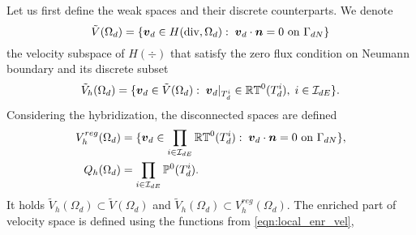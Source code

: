 Let us first define the weak spaces and their discrete counterparts.
We denote
\begin{equation}
    \tilde V(\Omega_d) = \{\mathbf{\boldsymbol{v}}_d \in H({\rm div},\Omega_d):\; \mathbf{\boldsymbol{v}}_d \cdot \mathbf{\boldsymbol{n}} = 0 \textrm{ on } \Gamma_{dN}\}
\end{equation}
the velocity subspace of $H(\div)$ that satisfy the zero flux condition on Neumann boundary
and its discrete subset
\begin{equation}
    \tilde V_h(\Omega_d) = \{\mathbf{\boldsymbol{v}}_d \in \tilde V(\Omega_d):\; \mathbf{\boldsymbol{v}}_d|_{T^i_d} \in\mathbb{RT}^0(T^i_d),\; i\in\mathcal{I}_{dE}\}.
\end{equation}
Considering the hybridization, the disconnected spaces are defined
\begin{align}
    V^{reg}_{h}(\Omega_d) &= \{\mathbf{\boldsymbol{v}}_d \in \prod_{i\in\mathcal{I}_{dE}} \mathbb{RT}^0(T^i_d):\;
        \mathbf{\boldsymbol{v}}_d \cdot \mathbf{\boldsymbol{n}} = 0 \textrm{ on } \Gamma_{dN}\}, \\
    Q_h(\Omega_d) &= \prod_{i\in\mathcal{I}_{dE}} \mathbb{P}^0(T^i_d).
\end{align}
It holds $\tilde V_h(\Omega_d) \subset \tilde V(\Omega_d)$ and $\tilde V_h(\Omega_d) \subset V^{reg}_h(\Omega_d)$.
The enriched part of velocity space is defined using the functions from \eqref{eqn:local_enr_vel},
